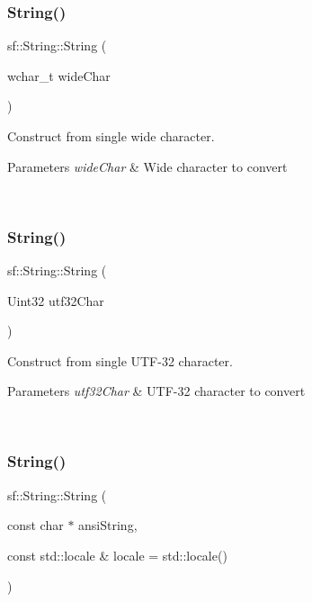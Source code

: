 \subsubsection{\texorpdfstring{String()}{String()}\hspace{0.1cm}{\footnotesize\ttfamily [3/11]}}
{\footnotesize\ttfamily sf\+::\+String\+::\+String (\begin{DoxyParamCaption}\item[{wchar\+\_\+t}]{wide\+Char }\end{DoxyParamCaption})}



Construct from single wide character. 


\begin{DoxyParams}{Parameters}
{\em wide\+Char} & Wide character to convert \begin{DoxyVerb}\end{DoxyVerb}
 \\
\hline
\end{DoxyParams}
\mbox{\label{classsf_1_1_string_a8e1a5027416d121187908e2ed77079ff}} 
\subsubsection{\texorpdfstring{String()}{String()}\hspace{0.1cm}{\footnotesize\ttfamily [4/11]}}
{\footnotesize\ttfamily sf\+::\+String\+::\+String (\begin{DoxyParamCaption}\item[{Uint32}]{utf32\+Char }\end{DoxyParamCaption})}



Construct from single U\+T\+F-\/32 character. 


\begin{DoxyParams}{Parameters}
{\em utf32\+Char} & U\+T\+F-\/32 character to convert \begin{DoxyVerb}\end{DoxyVerb}
 \\
\hline
\end{DoxyParams}
\mbox{\label{classsf_1_1_string_a57d2b8c289f9894f859564cad034bfc7}} 
\subsubsection{\texorpdfstring{String()}{String()}\hspace{0.1cm}{\footnotesize\ttfamily [5/11]}}
{\footnotesize\ttfamily sf\+::\+String\+::\+String (\begin{DoxyParamCaption}\item[{const char $\ast$}]{ansi\+String,  }\item[{const std\+::locale \&}]{locale = {\ttfamily std\+:\+:locale()} }\end{DoxyParamCaption})}



